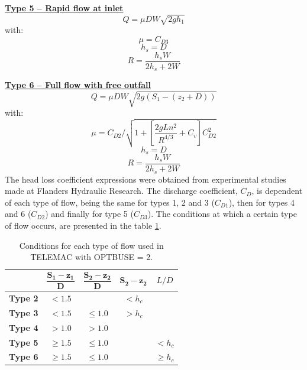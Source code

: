\underline{\textbf{Type 5 -- Rapid flow at inlet}}\\
\begin{equation}
Q= \mu D W \sqrt{2gh_1}
\end{equation}
with:
\begin{equation}
\mu = C_{D3}
\end{equation}
\begin{equation}
h_s = D
\end{equation}
\begin{equation}
R = \dfrac{h_s W}{2h_s+2W}
\end{equation}

\underline{\textbf{Type 6 -- Full flow with free outfall}}\\
\begin{equation}
Q = \mu D W \sqrt{2g(S_1-(z_2+D))}
\end{equation}
with:
\begin{equation}
\mu = C_{D2}/\sqrt{1+\left[\dfrac{2gLn^2}{R^{4/3}} +C_v \right] C_{D2}^2}
\end{equation}
\begin{equation}
h_s=D
\end{equation}
\begin{equation}
R=\dfrac{h_s W}{2h_s+2W}
\end{equation}
The head loss coefficient expressions were obtained from experimental studies made at
Flanders Hydraulic Research.
The discharge coefficient, $C_D$, is dependent of each type of flow, being the same for
types 1, 2 and 3 ($C_{D1}$), then for types 4 and 6 ($C_{D2}$) and finally for type 5 ($C_{D3}$).
The conditions at which a certain type of flow occurs,
are presented in the table \ref{tab:culverts_tab2}.

\begin{table}[H]
\caption{Conditions for each type of flow used in TELEMAC with OPTBUSE = 2.}
\label{tab:culverts_tab2}
\begin{center}\begin{tabular}{|c|c|c|c|c|}
\hline
~ & $\mathbf{\dfrac{S_1-z_1}{D}}$ & $\mathbf{\dfrac{S_2-z_2}{D}}$ & $\mathbf{S_2-z_2}$ & $L/D$ \\
\hline
\textbf{Type 2} & $<1.5$    &  ~ & $< h_c$ & ~ \\
\hline
\textbf{Type 3} & $<1.5$    & $\le 1.0$ & $> h_c$ & ~\\
\hline
\textbf{Type 4} & $> 1.0$   & $> 1.0$ & ~ & ~\\
\hline
\textbf{Type 5} & $\ge 1.5$ & $\le 1.0$ & ~ & $< h_c$\\
\hline
\textbf{Type 6} & $\ge 1.5$ & $\le 1.0$  & ~ & $\ge h_c$\\
\hline
\end{tabular}\end{center}
\end{table}

